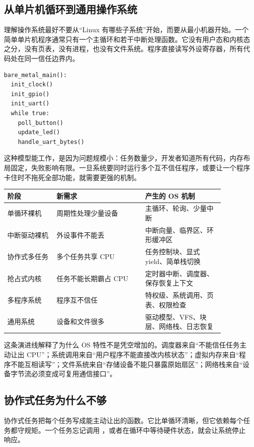 \subsection{从单片机循环到通用操作系统}

理解操作系统最好不要从“Linux 有哪些子系统”开始，而要从最小机器开始。一个简单单片机程序通常只有一个主循环和若干中断处理函数。它没有用户态和内核态之分，没有页表，没有进程，也没有文件系统。程序直接读写外设寄存器，所有代码处在同一信任边界内。

\begin{lstlisting}
bare_metal_main():
  init_clock()
  init_gpio()
  init_uart()
  while true:
    poll_button()
    update_led()
    handle_uart_bytes()
\end{lstlisting}

这种模型能工作，是因为问题规模小：任务数量少，开发者知道所有代码，内存布局固定，失败影响有限。一旦系统要同时运行多个互不信任程序，或要让一个程序卡住时不拖死全部功能，就需要更强的机制。

\begin{longtable}{p{0.2\linewidth}p{0.36\linewidth}p{0.32\linewidth}}
\toprule
阶段 & 新需求 & 产生的 OS 机制 \\
\midrule
单循环裸机 & 周期性处理少量设备 & 主循环、轮询、少量中断 \\
中断驱动裸机 & 外设事件不能丢 & 中断向量、临界区、环形缓冲区 \\
协作式多任务 & 多个任务共享 CPU & 任务控制块、显式 yield、简单栈切换 \\
抢占式内核 & 任务不能长期霸占 CPU & 定时器中断、调度器、保存恢复上下文 \\
多程序系统 & 程序互不信任 & 特权级、系统调用、页表、权限检查 \\
通用系统 & 设备和文件很多 & 驱动模型、VFS、块层、网络栈、日志恢复 \\
\bottomrule
\end{longtable}

这条演进线解释了为什么 OS 特性不是凭空增加的。调度器来自“不能信任任务主动让出 CPU”；系统调用来自“用户程序不能直接改内核状态”；虚拟内存来自“程序不能互相读写”；文件系统来自“存储设备不能只暴露原始扇区”；网络栈来自“设备字节流必须变成可复用通信接口”。

\subsection{协作式任务为什么不够}

协作式任务把每个任务写成能主动让出的函数。它比单循环清晰，但它依赖每个任务都守规矩。一个任务忘记调用 ，或者在循环中等待硬件状态，就会让系统停止响应。

